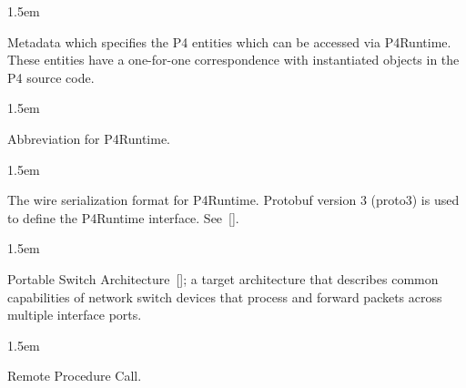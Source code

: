 \documentclass[11pt]{article}
\begin{document}
{\begin{mddefinitions}

\begin{mdbmarginx}{}{}{}{1.5em}%
\begin{mddefdata}%
Metadata which specifies the P4 entities which can be accessed via
P4Runtime. These entities have a one-for-one correspondence with
instantiated objects in the P4 source code.
\end{mddefdata}%
\end{mdbmarginx}%


\begin{mdbmarginx}{}{}{}{1.5em}%
\begin{mddefdata}%
Abbreviation for P4Runtime.
\end{mddefdata}%
\end{mdbmarginx}%


\begin{mdbmarginx}{}{}{}{1.5em}%
\begin{mddefdata}%
The wire serialization format for P4Runtime. Protobuf version 3 (proto3) is
used to define the P4Runtime interface. See~[].
\end{mddefdata}%
\end{mdbmarginx}%


\begin{mdbmarginx}{}{}{}{1.5em}%
\begin{mddefdata}%
Portable Switch Architecture~[]; a target architecture that describes
common capabilities of network switch devices that process and forward
packets across multiple interface ports.
\end{mddefdata}%
\end{mdbmarginx}%


\begin{mdbmarginx}{}{}{}{1.5em}%
\begin{mddefdata}%
Remote Procedure Call.
\end{mddefdata}%
\end{mdbmarginx}%


\end{mddefinitions}}
\end{document}
